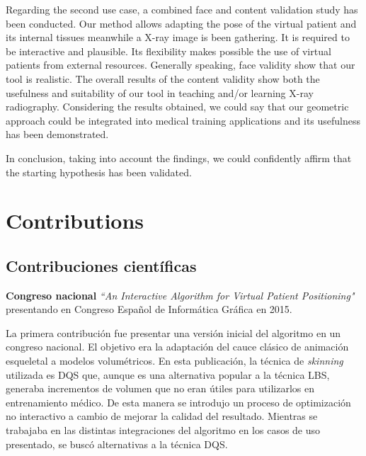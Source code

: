 Regarding the second use case, a combined face and content validation study has been conducted. 
Our method allows adapting the pose of the virtual patient and its internal tissues meanwhile a X-ray image is been gathering. It is required to be interactive and plausible. Its flexibility makes possible the use of virtual patients from external resources.
Generally speaking, face validity show that our tool is realistic. The overall results of the content validity show both the usefulness and suitability of our tool in teaching and/or learning X-ray radiography. %
Considering the results obtained, we could say that our geometric approach could be integrated into medical training applications and its usefulness has been demonstrated.

In conclusion, taking into account the findings, we could confidently affirm that the  starting hypothesis has been validated.




\section{Contributions}
\subsection{Contribuciones científicas}
\label{conclu:cientifica}

\textbf{Congreso nacional } \emph{``An Interactive Algorithm for Virtual Patient Positioning"} \cite{ceig.20151197} presentando en Congreso Español de Informática Gráfica en 2015. 

La primera contribución fue presentar una versión inicial del algoritmo en un congreso nacional. El objetivo era la adaptación del cauce clásico de animación esqueletal a modelos volumétricos. En esta publicación, la técnica de \emph{skinning} utilizada es \ac{DQS} que, aunque es una alternativa popular a la técnica \ac{LBS}, generaba incrementos de volumen que no eran útiles para utilizarlos en entrenamiento médico. De esta manera se introdujo un proceso de optimización no interactivo a cambio de mejorar la calidad del resultado. Mientras se trabajaba en las distintas integraciones del algoritmo en los casos de uso presentado, se buscó alternativas a la técnica \ac{DQS}.

